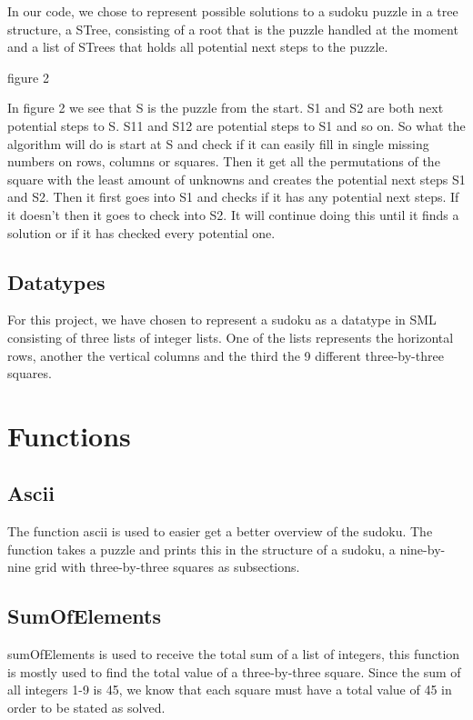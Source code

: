 \documentclass[12pt, a4paper]{report}
\begin{document}
In our code, we chose to represent possible solutions to a sudoku puzzle in a tree structure, a STree, consisting of a root that is the puzzle handled at the moment and a list of STrees that holds all potential next steps to the puzzle.

figure 2

In figure 2 we see that S is the puzzle from the start. S1 and S2 are both next potential steps to S. S11 and S12 are potential steps to S1 and so on. So what the algorithm will do is start at S and check if it can easily fill in single missing numbers on rows, columns or squares. Then it get all the permutations of the square with the least amount of unknowns and creates the potential next steps S1 and S2. Then it first goes into S1 and checks if it has any potential next steps. If it doesn’t then it goes to check into S2. It will continue doing this until it finds a solution or if it has checked every potential one.

\subsection{Datatypes}
For this project, we have chosen to represent a sudoku as a datatype in SML consisting of three lists of integer lists. One of the lists represents the horizontal rows, another the vertical columns and the third the 9 different three-by-three squares.


\section{Functions}

\subsection{Ascii}
The function ascii is used to easier get a better overview of the sudoku. The function takes a puzzle and prints this in the structure of a sudoku, a nine-by-nine grid with three-by-three squares as subsections.

\subsection{SumOfElements}
sumOfElements is used to receive the total sum of a list of integers, this function is mostly used to find the total value of a three-by-three square. Since the sum of all integers 1-9 is 45, we know that each square must have a total value of 45 in order to be stated as solved.
\end{document}
